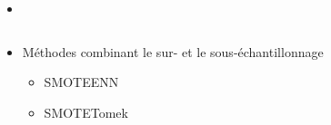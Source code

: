 \documentclass[8pt,aspectratio=169,hyperref={unicode=true}]{beamer}
\begin{document}
\begin{frame}{\insertsection}{\insertsubsection}
\begin{columns}
\begin{column}{.5\textwidth}
\begin{itemize}
\begin{itemize}
                          \item[]
                      \end{itemize}
            \end{itemize}
        \end{column}
    \end{columns}
    \begin{columns}
        \begin{column}{.5\textwidth}
            \begin{itemize}
                \item Méthodes combinant le sur- et le sous-échantillonnage
                      \begin{itemize}
                          \item SMOTEENN
                          \item SMOTETomek
                      \end{itemize}
            \end{itemize}
        \end{column}
    \end{columns}
\end{frame}
\end{document}
